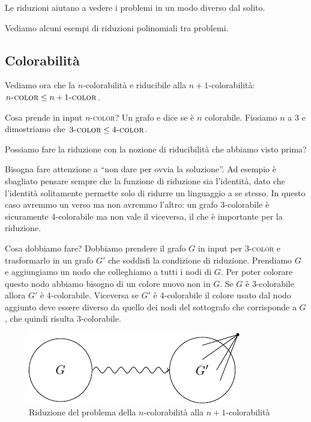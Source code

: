 Le riduzioni aiutano a vedere i problemi in un modo diverso dal solito.

Vediamo alcuni esempi di riduzioni polinomiali tra problemi.

\subsection{Colorabilità}

Vediamo ora che la $n$-colorabilità e riducibile alla $n+1$-colorabilità: $n\textsc{-color} \leq
n+1\textsc{-color}$.

Cosa prende in input $n$\textsc{-color}? Un grafo e dice se è $n$ colorabile. Fissiamo $n$ a 3 e dimostriamo
che $3\textsc{-color} \leq 4\textsc{-color}$.

Possiamo fare la riduzione con la nozione di riducibilità che abbiamo visto prima?

Bisogna fare attenzione a ``non dare per ovvia la soluzione''. Ad esempio è sbagliato pensare
sempre che la funzione di riduzione sia l'identità, dato che l'identità solitamente permette solo
di ridurre un linguaggio a se stesso. In questo caso avremmo un verso ma non avremmo l'altro: un
grafo 3-colorabile è sicuramente 4-colorabile ma non vale il viceversa, il che è importante per la
riduzione.

Cosa dobbiamo fare? Dobbiamo prendere il grafo $G$ in input per 3\textsc{-color} e trasformarlo in
un grafo $G'$ che soddisfi la condizione di riduzione. Prendiamo $G$ e aggiungiamo un nodo che
colleghiamo a tutti i nodi di $G$. Per poter colorare questo nodo abbiamo bisogno di un colore nuovo
non in $G$.  Se $G$ è 3-colorabile allora $G'$ è 4-colorabile. Viceversa se $G'$ è 4-colorabile
il colore usato dal nodo aggiunto deve essere diverso da quello dei nodi del sottografo che
corrisponde a $G$, che quindi risulta 3-colorabile.

\begin{figure}[h]
    \begin{center}
        \includegraphics{img/3COL4COL.pdf}
    \end{center}
    \caption{Riduzione del problema della $n$-colorabilità alla $n+1$-colorabilità}
\end{figure}

